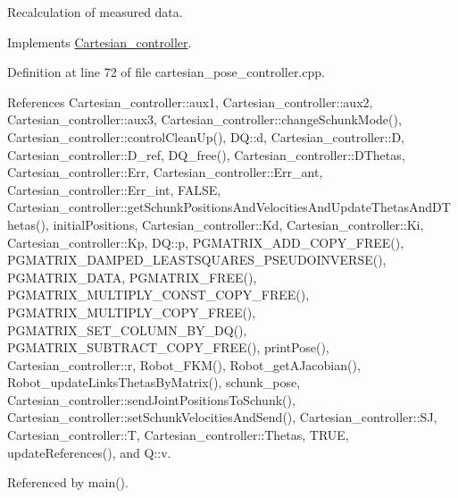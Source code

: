 Recalculation of measured data. 

Implements \hyperlink{classCartesian__controller_a8809167cab6d338a957439141fa2bf6c}{Cartesian\-\_\-controller}.



Definition at line 72 of file cartesian\-\_\-pose\-\_\-controller.\-cpp.



References Cartesian\-\_\-controller\-::aux1, Cartesian\-\_\-controller\-::aux2, Cartesian\-\_\-controller\-::aux3, Cartesian\-\_\-controller\-::change\-Schunk\-Mode(), Cartesian\-\_\-controller\-::control\-Clean\-Up(), D\-Q\-::d, Cartesian\-\_\-controller\-::\-D, Cartesian\-\_\-controller\-::\-D\-\_\-ref, D\-Q\-\_\-free(), Cartesian\-\_\-controller\-::\-D\-Thetas, Cartesian\-\_\-controller\-::\-Err, Cartesian\-\_\-controller\-::\-Err\-\_\-ant, Cartesian\-\_\-controller\-::\-Err\-\_\-int, F\-A\-L\-S\-E, Cartesian\-\_\-controller\-::get\-Schunk\-Positions\-And\-Velocities\-And\-Update\-Thetas\-And\-D\-Thetas(), initial\-Positions, Cartesian\-\_\-controller\-::\-Kd, Cartesian\-\_\-controller\-::\-Ki, Cartesian\-\_\-controller\-::\-Kp, D\-Q\-::p, P\-G\-M\-A\-T\-R\-I\-X\-\_\-\-A\-D\-D\-\_\-\-C\-O\-P\-Y\-\_\-\-F\-R\-E\-E(), P\-G\-M\-A\-T\-R\-I\-X\-\_\-\-D\-A\-M\-P\-E\-D\-\_\-\-L\-E\-A\-S\-T\-S\-Q\-U\-A\-R\-E\-S\-\_\-\-P\-S\-E\-U\-D\-O\-I\-N\-V\-E\-R\-S\-E(), P\-G\-M\-A\-T\-R\-I\-X\-\_\-\-D\-A\-T\-A, P\-G\-M\-A\-T\-R\-I\-X\-\_\-\-F\-R\-E\-E(), P\-G\-M\-A\-T\-R\-I\-X\-\_\-\-M\-U\-L\-T\-I\-P\-L\-Y\-\_\-\-C\-O\-N\-S\-T\-\_\-\-C\-O\-P\-Y\-\_\-\-F\-R\-E\-E(), P\-G\-M\-A\-T\-R\-I\-X\-\_\-\-M\-U\-L\-T\-I\-P\-L\-Y\-\_\-\-C\-O\-P\-Y\-\_\-\-F\-R\-E\-E(), P\-G\-M\-A\-T\-R\-I\-X\-\_\-\-S\-E\-T\-\_\-\-C\-O\-L\-U\-M\-N\-\_\-\-B\-Y\-\_\-\-D\-Q(), P\-G\-M\-A\-T\-R\-I\-X\-\_\-\-S\-U\-B\-T\-R\-A\-C\-T\-\_\-\-C\-O\-P\-Y\-\_\-\-F\-R\-E\-E(), print\-Pose(), Cartesian\-\_\-controller\-::r, Robot\-\_\-\-F\-K\-M(), Robot\-\_\-get\-A\-Jacobian(), Robot\-\_\-update\-Links\-Thetas\-By\-Matrix(), schunk\-\_\-pose, Cartesian\-\_\-controller\-::send\-Joint\-Positions\-To\-Schunk(), Cartesian\-\_\-controller\-::set\-Schunk\-Velocities\-And\-Send(), Cartesian\-\_\-controller\-::\-S\-J, Cartesian\-\_\-controller\-::\-T, Cartesian\-\_\-controller\-::\-Thetas, T\-R\-U\-E, update\-References(), and Q\-::v.



Referenced by main().



